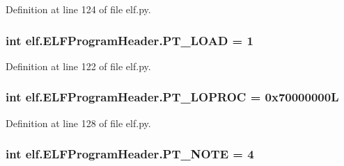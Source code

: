 Definition at line 124 of file elf.\+py.

\subsubsection[{\texorpdfstring{P\+T\+\_\+\+L\+O\+AD}{PT_LOAD}}]{\setlength{\rightskip}{0pt plus 5cm}int elf.\+E\+L\+F\+Program\+Header.\+P\+T\+\_\+\+L\+O\+AD = 1\hspace{0.3cm}{\ttfamily [static]}}\hypertarget{clasself_1_1_e_l_f_program_header_a7742cb114db8473ab9699d8637c9cc5c}{}\label{clasself_1_1_e_l_f_program_header_a7742cb114db8473ab9699d8637c9cc5c}


Definition at line 122 of file elf.\+py.

\subsubsection[{\texorpdfstring{P\+T\+\_\+\+L\+O\+P\+R\+OC}{PT_LOPROC}}]{\setlength{\rightskip}{0pt plus 5cm}int elf.\+E\+L\+F\+Program\+Header.\+P\+T\+\_\+\+L\+O\+P\+R\+OC = 0x70000000L\hspace{0.3cm}{\ttfamily [static]}}\hypertarget{clasself_1_1_e_l_f_program_header_ae9426efb84c8121d48f15598746b55c6}{}\label{clasself_1_1_e_l_f_program_header_ae9426efb84c8121d48f15598746b55c6}


Definition at line 128 of file elf.\+py.

\subsubsection[{\texorpdfstring{P\+T\+\_\+\+N\+O\+TE}{PT_NOTE}}]{\setlength{\rightskip}{0pt plus 5cm}int elf.\+E\+L\+F\+Program\+Header.\+P\+T\+\_\+\+N\+O\+TE = 4\hspace{0.3cm}{\ttfamily [static]}}\hypertarget{clasself_1_1_e_l_f_program_header_a826845f09b4727ebacd01389ced03481}{}\label{clasself_1_1_e_l_f_program_header_a826845f09b4727ebacd01389ced03481}


